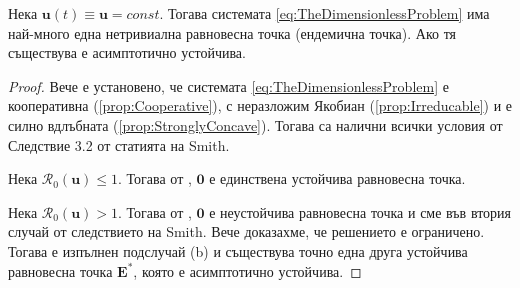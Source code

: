 \begin{proposition}
  Нека $\mathbf{u}(t)\equiv \mathbf{u}=const$. Тогава системата \eqref{eq:TheDimensionlessProblem} има най-много една нетривиална равновесна точка (ендемична точка).
  Ако тя съществува е асимптотично устойчива.
\end{proposition}

\begin{proof}
  Вече е установено, че системата \eqref{eq:TheDimensionlessProblem} е кооперативна (\eqref{prop:Cooperative}), с неразложим Якобиан (\eqref{prop:Irreducable}) и е силно вдлъбната (\eqref{prop:StronglyConcave}). Тогава са налични всички условия от Следствие 3.2 от статията \cite{Smith1986} на Smith.

  Нека $\mathscr{R}_0(\mathbf{u}) \leq 1$. Тогава от \cite{Driessche2002}, $\mathbf{0}$ е единствена устойчива равновесна точка.

  Нека $\mathscr{R}_0(\mathbf{u}) > 1$. Тогава от \cite{Driessche2002}, $\mathbf{0}$ е неустойчива равновесна точка и сме във втория случай от следствието на Smith. Вече доказахме, че решението е ограничено. Тогава е изпълнен подслучай (b) и съществува точно една друга устойчива равновесна точка $\mathbf{E}^*$, която е асимптотично устойчива.
\end{proof}

